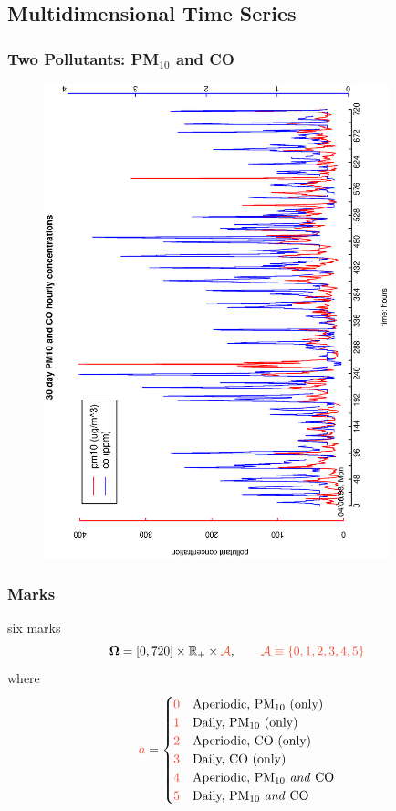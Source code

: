 \documentclass[dvips]{beamer}
\newcommand{\bs}[2]{\begin{frame} \frametitle{#1} 
{#2}
\end{frame} }
\newcommand{\red}{\textcolor{RedOrange}}
\begin{document}
\subsection{Multidimensional Time Series}
\bs{Two Pollutants: PM$_{10}$ and CO} {
\begin{figure}[!h]
  \begin{center}
    \includegraphics[angle=270,origin=l,totalheight=6truecm,
     clip=1,width=10cm]{30daypm10co.ps}
  \end{center}
\end{figure}
}
\bs{Marks} {
\red{six marks}
\[ \bfOmega = [0,720] \times \bbR_+ \times \red{\cA},
\qquad \red{\cA\equiv\{0,1,2,3,4,5\}} \]
where
\[ \red a = \begin{cases}
        \red0&\textrm{Aperiodic, PM$_{10}$ (only)}\\
        \red1&\textrm{Daily, PM$_{10}$ (only)}\\
        \red2&\textrm{Aperiodic, CO (only)}\\
        \red3&\textrm{Daily, CO (only)}\\
        \red4&\textrm{Aperiodic, PM$_{10}$ \textit{and} CO}\\
        \red5&\textrm{Daily, PM$_{10}$ \textit{and} CO}
\end{cases}\]
}
\end{document}
